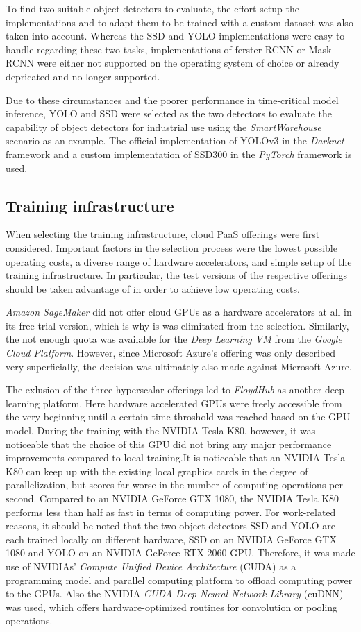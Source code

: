 \documentclass[a4paper, 10pt, journal]{wissarbIEEE}      %
\begin{document}
To find two suitable object detectors to evaluate, the effort setup the implementations and to adapt them to be trained with a custom dataset was also taken into account. Whereas the SSD and YOLO implementations were easy to handle regarding these two tasks, implementations of ferster-RCNN or Mask-RCNN were either not supported on the operating system of choice or already depricated and no longer supported. 

Due to these circumstances and the poorer performance in time-critical model inference, YOLO and SSD were selected as the two detectors to evaluate the capability of object detectors for industrial use using the \textit{SmartWarehouse} scenario as an example. The official implementation of YOLOv3 in the \textit{Darknet} framework and a custom implementation of SSD300 in the \textit{PyTorch} framework is used.

\subsection{Training infrastructure}

When selecting the training infrastructure, cloud PaaS offerings were first considered. Important factors in the selection process were the lowest possible operating costs, a diverse range of hardware accelerators, and simple setup of the training infrastructure. In particular, the test versions of the respective offerings should be taken advantage of in order to achieve low operating costs.

\textit{Amazon SageMaker} did not offer cloud GPUs as a hardware accelerators at all in its free trial version, which is why is was elimitated from the selection. Similarly, the not enough quota was available for the \textit{Deep Learning VM} from the  \textit{Google Cloud Platform}. However, since Microsoft Azure's offering was only described very superficially, the decision was ultimately also made against Microsoft Azure.

The exlusion of the three hyperscalar offerings led to \textit{FloydHub} as another deep learning platform. Here hardware accelerated GPUs were freely accessible from the very beginning until a certain time throshold was reached based on the GPU model. During the training with the NVIDIA Tesla K80, however, it was noticeable that the choice of this GPU did not bring any major performance improvements compared to local training.It is noticeable that an NVIDIA Tesla K80 can keep up with the existing local graphics cards in the degree of parallelization, but scores far worse in the number of computing operations per second. Compared to an NVIDIA GeForce GTX 1080, the NVIDIA Tesla K80 performs less than half as fast in terms of computing power. For work-related reasons, it should be noted that the two object detectors SSD and YOLO are each trained locally on different hardware, SSD on an NVIDIA GeForce GTX 1080 and YOLO on an NVIDIA GeForce RTX 2060 GPU. Therefore, it was made use of NVIDIAs' \textit{Compute Unified Device Architecture} (CUDA) as a programming model and parallel computing platform to offload computing power to the GPUs. Also the NVIDIA \textit{CUDA Deep Neural Network Library} (cuDNN) was used, which offers hardware-optimized routines for convolution or pooling operations. 
\end{document}
